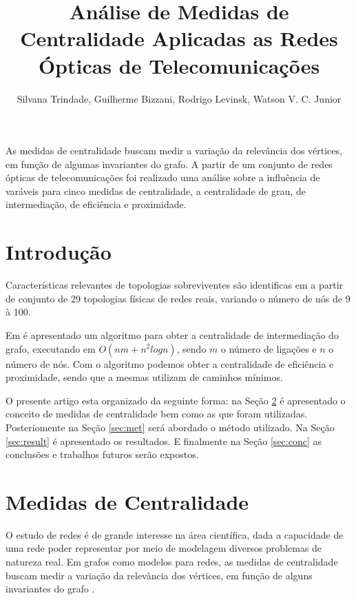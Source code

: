 \documentclass[12pt]{article}
\title{Análise de Medidas de Centralidade Aplicadas as Redes Ópticas de Telecomunicações}
\author{Silvana Trindade\inst{1}, Guilherme Bizzani\inst{1}, Rodrigo Levinsk\inst{1}, Watson V. C. Junior\inst{1}}
\begin{document}
 

\maketitle

\begin{abstract}
 
\end{abstract}
\begin{resumo} 
As medidas de centralidade buscam medir a variação da relevância dos vértices, em função de algumas invariantes do grafo.
 A partir de um conjunto de redes ópticas de telecomunicações foi realizado uma análise sobre a influência de varáveis para cinco medidas de centralidade, a centralidade de grau, de intermediação, de eficiência e proximidade.

\end{resumo}


\section{Introdução}

Características relevantes de topologias sobreviventes são identificas em \cite{pavan} a partir de conjunto de $29$ topologias físicas de redes reais, variando o número de nós de 9 à 100.

Em \cite{Brandes01afaster} é apresentado um algoritmo para obter a centralidade de intermediação do grafo, executando em $O(nm + n^2 log n)$, sendo $m$ o número de ligações e $n$ o número de nós.
Com o algoritmo podemos obter a centralidade de eficiência e proximidade, sendo que a mesmas utilizam de caminhos mínimos.

O presente artigo esta organizado da seguinte forma: na Seção \ref{sec:mc} é apresentado o conceito de medidas de centralidade bem como as que foram utilizadas.
Posteriomente na  Seção \ref{sec:met} será abordado o método utilizado. 
Na Seção \ref{sec:result} é apresentado os resultados.
E finalmente na Seção \ref{sec:conc} as conclusões e trabalhos futuros serão expostos. 

\section{Medidas de Centralidade}\label{sec:mc}

O estudo de redes é de grande interesse na área científica, dada a capacidade de uma rede poder representar por meio de modelagem diversos problemas de natureza real.
Em grafos como modelos para redes, as medidas de centralidade buscam medir a variação da relevância dos vértices, em função de alguns invariantes do grafo \cite{freitas}.
\end{document}
